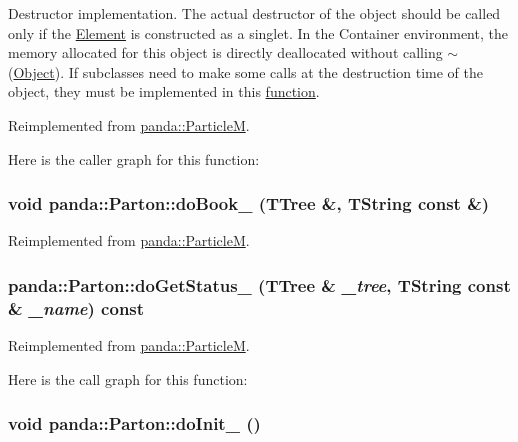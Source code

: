 Destructor implementation. The actual destructor of the object should be called only if the \hyperlink{classpanda_1_1Element}{Element} is constructed as a singlet. In the Container environment, the memory allocated for this object is directly deallocated without calling $\sim$(\hyperlink{classpanda_1_1Object}{Object}). If subclasses need to make some calls at the destruction time of the object, they must be implemented in this \hyperlink{namespacepanda_1_1function}{function}. 

Reimplemented from \hyperlink{classpanda_1_1ParticleM_abef15d28e6e33ee92c0b318bd41af2ca}{panda::ParticleM}.

Here is the caller graph for this function:\hypertarget{classpanda_1_1Parton_a6a1af1903a231bc8db97242dda42979a}{
\subsubsection[{doBook\_\-}]{\setlength{\rightskip}{0pt plus 5cm}void panda::Parton::doBook\_\- (TTree \&, \/  TString const \&)}}
\label{classpanda_1_1Parton_a6a1af1903a231bc8db97242dda42979a}


Reimplemented from \hyperlink{classpanda_1_1ParticleM_a55d6e7e91edbc88e980a0031c299ef18}{panda::ParticleM}.\hypertarget{classpanda_1_1Parton_ab3709c6ae8b88560326291d4d1598c6b}{
\subsubsection[{doGetStatus\_\-}]{ panda::Parton::doGetStatus\_\- (TTree \& {\em \_\-tree}, \/  TString const \& {\em \_\-name}) const}}
\label{classpanda_1_1Parton_ab3709c6ae8b88560326291d4d1598c6b}


Reimplemented from \hyperlink{classpanda_1_1ParticleM_a003a63672058369e9bbea413e055b1c1}{panda::ParticleM}.

Here is the call graph for this function:\hypertarget{classpanda_1_1Parton_a4f94d91e76ce70fca972bcdbafec00c2}{
\subsubsection[{doInit\_\-}]{\setlength{\rightskip}{0pt plus 5cm}void panda::Parton::doInit\_\- ()}}
\label{classpanda_1_1Parton_a4f94d91e76ce70fca972bcdbafec00c2}



